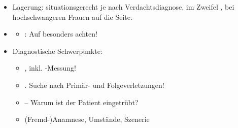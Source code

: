 \label{proc:MR40001B}
\label{m:bewusstseinstruebung}
\begin{itemize}
  \item Lagerung: situationsgerecht je nach
  Verdachtsdiagnose, im Zweifel , bei hochschwangeren Frauen auf die
   Seite.
  \item \TxBeiVit \TxMassVitMKBes
  
  \begin{itemize}
    \item {}: Auf 
    besonders achten!
  \end{itemize}
  
  
  \item Diagnostische Schwerpunkte:
  \begin{itemize}
    \item {}, inkl. -Messung!
    \item {}. Suche nach Primär- und
    Folgeverletzungen!
    \item {} -- Warum ist der
    Patient eingetrübt?
    \item (Fremd-)Anamnese, Umstände, Szenerie
  \end{itemize}
\end{itemize}
